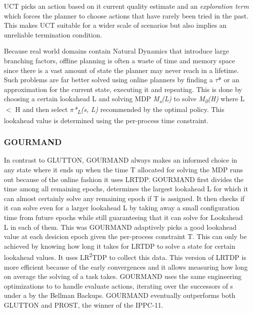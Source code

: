 \documentclass[runningheads,a4paper]{llncs}
\begin{document}
UCT picks an action based on it current quality estimate and an \emph{exploration term} which forces the planner to choose actions that have rarely been tried in the past. This makes UCT suitable for a wider scale of scenarios but also implies an unreliable termination condition. 

Because real world domains contain Natural Dynamics that introduce large branching factors, offline planning is often a waste of time and memory space since there is a vast amount of state the planner may never reach in a lifetime. Such problems are far better solved using online planners by finding a $\tau$* or an approximation for the current state, executing it and repeating. This is done by choosing a certain lookahead  L and solving MDP \emph{M\textsubscript{s}(L)} to solve \emph{M\textsubscript{0}(H)} where L $<$ H and then select \emph{$\pi$*\textsubscript{L}(s, L)} recommended by the optimal policy. This lookahead value is determined using the per-process time constraint. 

\subsubsection{GOURMAND}
In contrast to GLUTTON, GOURMAND always makes an informed choice in any state where it ends up when the time T allocated for solving the MDP runs out because of the online fashion it uses LRTDP. GOURMAND first divides the time among all remaining epochs, determines the largest lookahead L for which it can almost certainly solve any remaining epoch if T is assigned.  It then checks if it can solve even for a larger lookahead L by taking away a small configuration time from future epochs  while still guaranteeing that it can solve for Lookahead L in each of them. This was GOURMAND adaptively picks a good lookahead value at each desicion epoch given the per-process constraint T. This can only be achieved by knowing how long it takes for LRTDP to solve a state for certain lookahead values. It uses LR\textsuperscript{2}TDP to collect this data. This version of LRTDP is more efficient because of the early convergences and it allows measuring how long on average the solving of a task takes. GOURMAND uses the same engineering optimizations to to handle evaluate actions, iterating over the successors of s under a by the Bellman Backups. GOURMAND eventually outperforms both GLUTTON and PROST, the winner of the IPPC-11\cite{keller2012prost}.  


\end{document}
